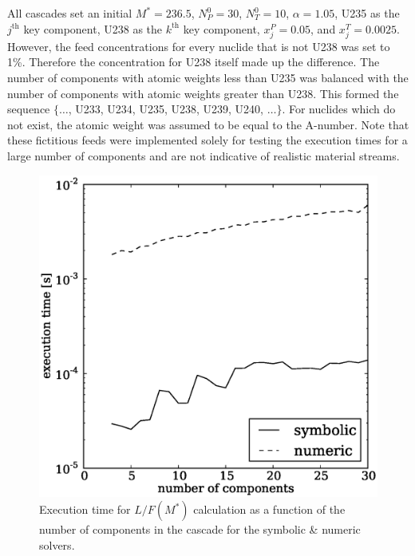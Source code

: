 \documentclass[preprint,12pt]{elsarticle}
\newcommand{\nuc}[2]{{#1}{#2}}
\newcommand{\jth}[0]{$j^{\mbox{th}}$ }
\newcommand{\kth}[0]{$k^{\mbox{th}}$ }
\begin{document}
All cascades set  an initial $M^*=236.5$,
$N_P^0=30$, $N_T^0=10$, $\alpha=1.05$, \nuc{U}{235} as the \jth key
component, \nuc{U}{238} as the \kth key component, $x_j^P=0.05$, and
$x_j^T=0.0025$.  However, the feed concentrations for every nuclide that is not
\nuc{U}{238} was set to 1\%.
Therefore the concentration for \nuc{U}{238} itself made up the difference.  
The number
of components with atomic weights less than \nuc{U}{235} was balanced with the 
number of components with atomic weights greater than \nuc{U}{238}.  This formed
the sequence $\{\ldots$, \nuc{U}{233}, \nuc{U}{234}, \nuc{U}{235}, \nuc{U}{238}, 
\nuc{U}{239}, \nuc{U}{240}, $\ldots\}$.  For nuclides which do not exist, the 
atomic weight was assumed to be equal to the A-number.  Note that these fictitious
feeds were implemented solely for testing the execution times for a large number
of components and are not indicative of realistic material streams.

\begin{figure}[htpb]
\begin{center}
\includegraphics[scale=0.5]{solver_exec_times.eps}
\caption{Execution time for $L/F(M^*)$ calculation as a function of the number of 
    components in the cascade for the symbolic \& numeric solvers.}
\label{solver_exec_times_fig}
\end{center}
\end{figure}
\end{document}
